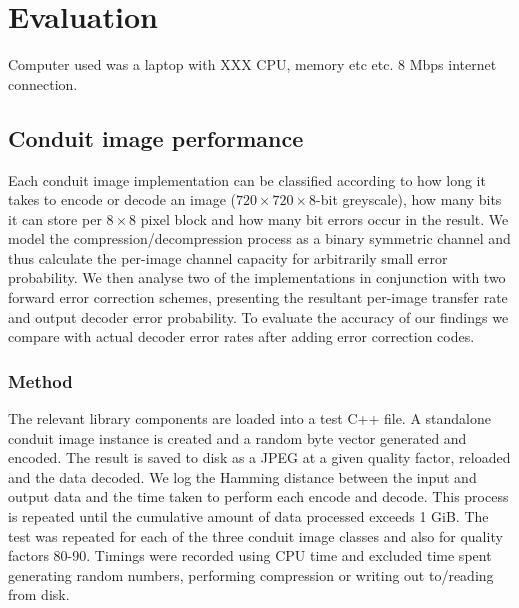 \chapter{Evaluation}\label{ch:evaluation}

Computer used was a laptop with XXX CPU, memory etc etc. 8 Mbps internet connection. 

\section{Conduit image performance}

Each conduit image implementation can be classified according to how long it takes to encode or decode an image ($720 \times 720 \times 8$-bit greyscale), how many bits it can store per $8 \times 8$ pixel block and how many bit errors occur in the result. We model the compression/decompression process as a binary symmetric channel and thus calculate the per-image channel capacity for arbitrarily small error probability. We then analyse two of the implementations in conjunction with two forward error correction schemes, presenting the resultant per-image transfer rate and output decoder error probability. To evaluate the accuracy of our findings we compare with actual decoder error rates after adding error correction codes.

\subsection{Method}

The relevant library components are loaded into a test C++ file. A standalone conduit image instance is created and a random byte vector generated and encoded. The result is saved to disk as a JPEG at a given quality factor, reloaded and the data decoded. We log the Hamming distance between the input and output data and the time taken to perform each encode and decode. This process is repeated until the cumulative amount of data processed exceeds 1 GiB. The test was repeated for each of the three conduit image classes and also for quality factors 80-90. Timings were recorded using CPU time and excluded time spent generating random numbers, performing compression or writing out to/reading from disk.

